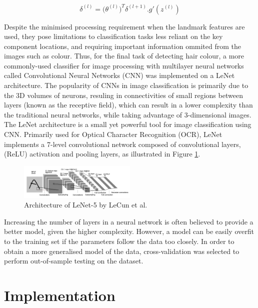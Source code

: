 \documentclass[conference]{IEEEtran}
\begin{document}
\begin{equation}
\delta^{(l)} = \big(\theta^{(l)}\big)^T \delta^{(l+1)}.g'(z^{(l)})
\label{eq: backprop}
\end{equation}

Despite the minimised processing requirement when the landmark features are used, they pose limitations to classification tasks less reliant on the key component locations, and requiring important information ommited from the images such as colour. Thus, for the final task of detecting hair colour, a more commonly-used classifier for image processing with multilayer neural networks called Convolutional Neural Networks (CNN) was implemented on a LeNet architecture. The popularity of CNNs in image classification is primarily due to the 3D volumes of neurons, resuling in connectivities of small regions between layers (known as the receptive field), which can result in a lower complexity than the traditional neural networks, while taking advantage of 3-dimensional images. 
The LeNet architecture is a small yet powerful tool for image classification using CNN. Primarily used for Optical Character Recognition (OCR), LeNet implements a 7-level convolutional network composed of convolutional layers, (ReLU) activation and pooling layers, as illustrated in Figure \ref{fig: LeNet}.

\begin{figure} [h] %
  \centering
    \includegraphics[width=0.5\textwidth]{graphs/LeNet} 
    \caption{Architecture of LeNet-5 by LeCun et al. \cite{LeCun}}
    \label{fig: LeNet}
\end{figure}

Increasing the number of layers in a neural network is often believed to provide a better model, given the higher complexity. However, a model can be easily overfit to the training set if the parameters follow the data too closely.
In order to obtain a more generalised model of the data, cross-validation was selected to perform out-of-sample testing on the dataset.

\section{Implementation} \label{s-implement}
\end{document}
